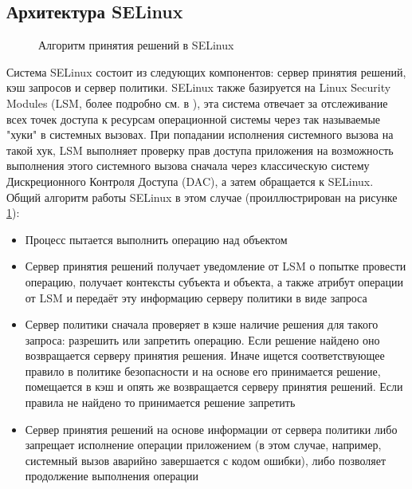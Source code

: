 \subsection{Архитектура SELinux} 
\begin{figure}
\centering
{} 
\caption{Алгоритм принятия решений в SELinux}
\label{fig:selarch}
\end{figure}
Система SELinux состоит из следующих компонентов: сервер принятия
решений, кэш запросов и сервер политики.  SELinux также базируется на
Linux Security Modules (LSM, более подробно см. в \cite{LSM}), эта
система отвечает за отслеживание всех точек доступа к ресурсам
операционной системы через так называемые "хуки" в системных вызовах.
При попадании исполнения системного вызова на такой хук, LSM выполняет
проверку прав доступа приложения на возможность выполнения этого
системного вызова сначала через классическую систему Дискреционного
Контроля Доступа (DAC), а затем обращается к SELinux.  Общий алгоритм
работы SELinux в этом случае (проиллюстрирован на рисунке
\ref{fig:selarch}): 
\begin{itemize}
\item Процесс пытается выполнить операцию над объектом 
\item Сервер принятия решений получает уведомление от LSM о попытке
    провести операцию, получает контексты субъекта и объекта, а также
    атрибут операции от LSM и передаёт эту информацию серверу политики в
    виде запроса 
\item Сервер политики сначала проверяет в кэше наличие решения для
    такого запроса: разрешить или запретить операцию. Если решение
    найдено оно возвращается серверу принятия решения. Иначе ищется
    соответствующее правило в политике безопасности и на основе его
    принимается решение, помещается в кэш и опять же возвращается
    серверу принятия решений. Если правила не найдено то принимается
    решение запретить 
\item Сервер принятия решений на основе информации от сервера политики
    либо запрещает исполнение операции приложением (в этом случае,
    например, системный вызов аварийно завершается с кодом ошибки), либо
    позволяет продолжение выполнения операции 
\end{itemize}

